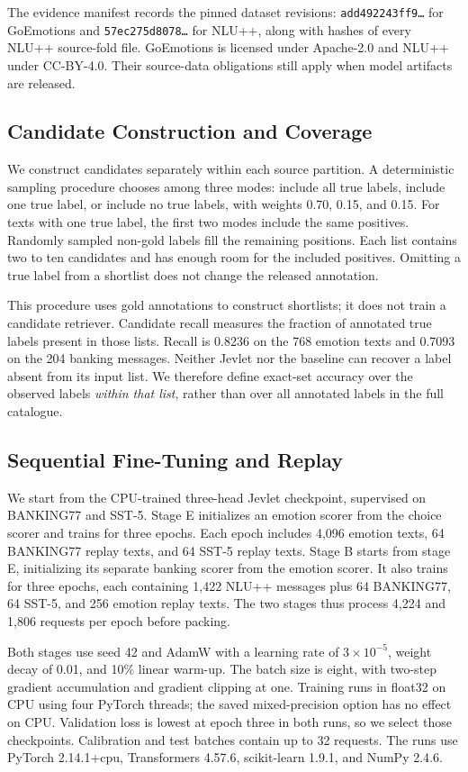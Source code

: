 \documentclass[conference]{IEEEtran}
\begin{document}
The evidence manifest records the pinned dataset revisions: \texttt{add492243ff9\ldots} for GoEmotions and \texttt{57ec275d8078\ldots} for NLU++, along with hashes of every NLU++ source-fold file. GoEmotions is licensed under Apache-2.0 and NLU++ under CC-BY-4.0. Their source-data obligations still apply when model artifacts are released.

\subsection{Candidate Construction and Coverage}
We construct candidates separately within each source partition. A deterministic sampling procedure chooses among three modes: include all true labels, include one true label, or include no true labels, with weights 0.70, 0.15, and 0.15. For texts with one true label, the first two modes include the same positives. Randomly sampled non-gold labels fill the remaining positions. Each list contains two to ten candidates and has enough room for the included positives. Omitting a true label from a shortlist does not change the released annotation.

This procedure uses gold annotations to construct shortlists; it does not train a candidate retriever. Candidate recall measures the fraction of annotated true labels present in those lists. Recall is 0.8236 on the 768 emotion texts and 0.7093 on the 204 banking messages. Neither Jevlet nor the baseline can recover a label absent from its input list. We therefore define exact-set accuracy over the observed labels \emph{within that list}, rather than over all annotated labels in the full catalogue.

\subsection{Sequential Fine-Tuning and Replay}
We start from the CPU-trained three-head Jevlet checkpoint, supervised on BANKING77 and SST-5. Stage E initializes an emotion scorer from the choice scorer and trains for three epochs. Each epoch includes 4,096 emotion texts, 64 BANKING77 replay texts, and 64 SST-5 replay texts. Stage B starts from stage E, initializing its separate banking scorer from the emotion scorer. It also trains for three epochs, each containing 1,422 NLU++ messages plus 64 BANKING77, 64 SST-5, and 256 emotion replay texts. The two stages thus process 4,224 and 1,806 requests per epoch before packing.

Both stages use seed 42 and AdamW with a learning rate of $3\times10^{-5}$, weight decay of 0.01, and 10\% linear warm-up. The batch size is eight, with two-step gradient accumulation and gradient clipping at one. Training runs in float32 on CPU using four PyTorch threads; the saved mixed-precision option has no effect on CPU. Validation loss is lowest at epoch three in both runs, so we select those checkpoints. Calibration and test batches contain up to 32 requests. The runs use PyTorch 2.14.1+cpu, Transformers 4.57.6, scikit-learn 1.9.1, and NumPy 2.4.6.
\end{document}
